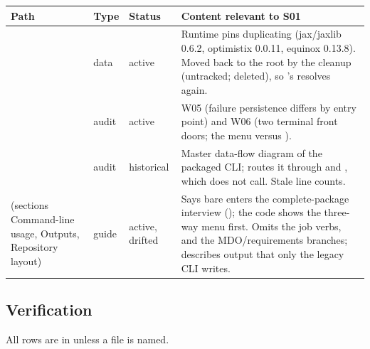 {\footnotesize
\begin{longtable}{P{4.7cm}P{1.8cm}P{1.5cm}P{7.4cm}}
\toprule
Path & Type & Status & Content relevant to S01 \\
\midrule
\endhead
{} & data & active & Runtime pins duplicating  (jax/jaxlib 0.6.2, optimistix 0.0.11, equinox 0.13.8). Moved back to the root by the cleanup (untracked;  deleted), so 's   resolves again. \\
 & audit & active & W05 (failure persistence differs by entry point) and W06 (two terminal front doors; the menu versus  ). \\
 & audit & historical & Master data-flow diagram of the packaged CLI; routes it through  and , which  does not call. Stale line counts. \\
 (sections Command-line usage, Outputs, Repository layout) & guide & active, drifted & Says bare  enters the complete-package interview (); the code shows the three-way menu first. Omits the job verbs,  and the MDO/requirements branches; describes  output that only the legacy CLI writes. \\
\bottomrule
\end{longtable}}

\subsection{Verification}\label{sec:s01-tests}

All rows are in  unless a file is named.

